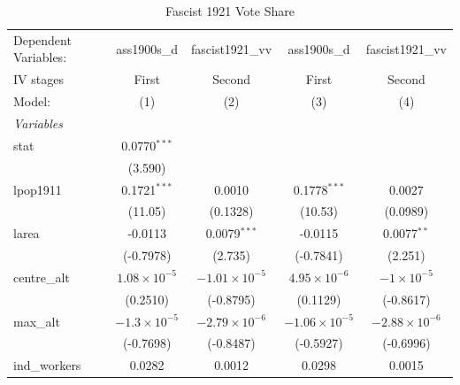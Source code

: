 
\begin{table}[htbp]
   \caption{Fascist 1921 Vote Share}
   \centering
   \begin{tabular}{lcccc}
      \tabularnewline \midrule \midrule
      Dependent Variables:             & ass1900s\_d           & fascist1921\_vv        & ass1900s\_d            & fascist1921\_vv\\   
      IV stages                        & First                 & Second                 & First                  & Second \\   
      Model:                           & (1)                   & (2)                    & (3)                    & (4)\\  
      \midrule
      \emph{Variables}\\
      stat                             & 0.0770$^{***}$        &                        &                        &   \\   
                                       & (3.590)               &                        &                        &   \\   
      lpop1911                         & 0.1721$^{***}$        & 0.0010                 & 0.1778$^{***}$         & 0.0027\\   
                                       & (11.05)               & (0.1328)               & (10.53)                & (0.0989)\\   
      larea                            & -0.0113               & 0.0079$^{***}$         & -0.0115                & 0.0077$^{**}$\\   
                                       & (-0.7978)             & (2.735)                & (-0.7841)              & (2.251)\\   
      centre\_alt                      & $1.08\times 10^{-5}$  & $-1.01\times 10^{-5}$  & $4.95\times 10^{-6}$   & $-1\times 10^{-5}$\\    
                                       & (0.2510)              & (-0.8795)              & (0.1129)               & (-0.8617)\\   
      max\_alt                         & $-1.3\times 10^{-5}$  & $-2.79\times 10^{-6}$  & $-1.06\times 10^{-5}$  & $-2.88\times 10^{-6}$\\    
                                       & (-0.7698)             & (-0.8487)              & (-0.5927)              & (-0.6996)\\   
      ind\_workers                     & 0.0282                & 0.0012                 & 0.0298                 & 0.0015\\   

\end{tabular}
\end{table}
